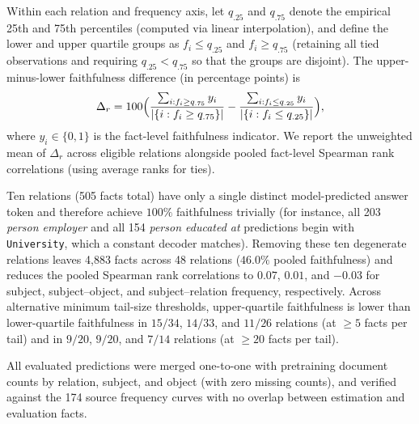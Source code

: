 Within each relation and frequency axis, let $q_{.25}$ and $q_{.75}$ denote the
empirical 25th and 75th percentiles (computed via linear interpolation), and
define the lower and upper quartile groups as $f_i\leq q_{.25}$ and $f_i\geq
q_{.75}$ (retaining all tied observations and requiring $q_{.25}<q_{.75}$ so
that the groups are disjoint). The upper-minus-lower faithfulness difference (in
percentage points) is
\begin{equation}
  \Delta_r=100\Bigl(
    \frac{\sum_{i:f_i\geq q_{.75}} y_i}{|\{i:f_i\geq q_{.75}\}|}
    -\frac{\sum_{i:f_i\leq q_{.25}} y_i}{|\{i:f_i\leq q_{.25}\}|}
  \Bigr),
\end{equation}
where $y_i\in\{0,1\}$ is the fact-level faithfulness indicator. We report the
unweighted mean of $\Delta_r$ across eligible relations alongside pooled
fact-level Spearman rank correlations (using average ranks for ties).

Ten relations (505 facts total) have only a single distinct model-predicted
answer token and therefore achieve $100\%$ faithfulness trivially (for instance,
all 203 \emph{person employer} and all 154 \emph{person educated at} predictions
begin with \texttt{University}, which a constant decoder matches). Removing
these ten degenerate relations leaves 4,883 facts across 48 relations ($46.0\%$
pooled faithfulness) and reduces the pooled Spearman rank correlations to
$0.07$, $0.01$, and $-0.03$ for subject, subject--object, and
subject--relation frequency, respectively. Across
alternative minimum tail-size thresholds, upper-quartile faithfulness is lower
than lower-quartile faithfulness in $15/34$, $14/33$, and $11/26$ relations (at
$\geq 5$ facts per tail) and in $9/20$, $9/20$, and $7/14$ relations (at $\geq
20$ facts per tail).

\begin{table}[t]
  \centering
  \small
  
  \caption{Fact-level Spearman correlations and numbers of eligible relations
  with lower, equal, or higher upper-quartile faithfulness. Counts describe
  differences without significance testing.}
  \label{tab:lment-aggregate}
\end{table}

\begin{table}[t]
  \centering
  \small
  
  \caption{Illustrative subject--object frequency quartiles. Fractions give
  faithful predictions divided by evaluated facts. The same relation-specific
  decoder is used for both groups.}
  \label{tab:lment-examples}
\end{table}

All evaluated predictions were merged one-to-one with pretraining document
counts by relation, subject, and object (with zero missing counts), and verified
against the 174 source frequency curves with no overlap between estimation and
evaluation facts.
